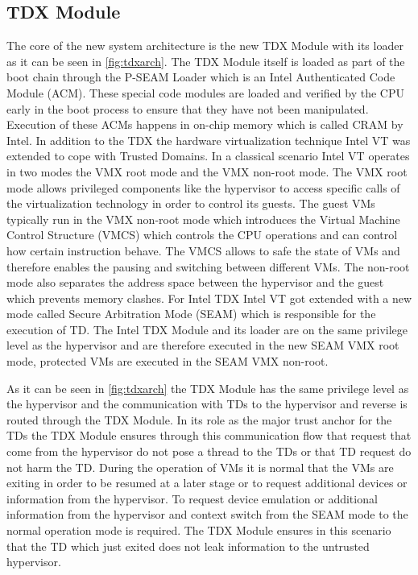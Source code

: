 \documentclass[sigplan,screen,nonacm]{acmart}
\begin{document}
\subsection{TDX Module}
The core of the new system architecture is the new TDX Module with its loader as it can be seen in \cref{fig:tdxarch}.
The TDX Module itself is loaded as part of the boot chain through the P-SEAM Loader which is an Intel Authenticated Code Module (ACM).
These special code modules are loaded and verified by the CPU early in the boot process to ensure that they have not been manipulated.
Execution of these ACMs happens in on-chip memory which is called CRAM by Intel.
In addition to the TDX the hardware virtualization technique Intel VT was extended to cope with Trusted Domains.
In a classical scenario Intel VT operates in two modes the VMX root mode and the VMX non-root mode.
The VMX root mode allows privileged components like the hypervisor to access specific calls of the virtualization technology in order to control its guests.
The guest VMs typically run in the VMX non-root mode which introduces the Virtual Machine Control Structure (VMCS) which controls the CPU operations and can control how certain instruction behave. The VMCS allows to safe the state of VMs and therefore enables the pausing and switching between different VMs.
The non-root mode also separates the address space between the hypervisor and the guest which prevents memory clashes\cite{VTx}.
For Intel TDX Intel VT got extended with a new mode called Secure Arbitration Mode (SEAM) which is responsible for the execution of TD.
The Intel TDX Module  and its loader are on the same privilege level as the hypervisor and are therefore executed in the new SEAM VMX root mode, protected VMs are executed in the SEAM VMX non-root.

As it can be seen in \cref{fig:tdxarch} the TDX Module has the same privilege level as the hypervisor and the communication with TDs to the hypervisor and reverse is routed through the TDX Module.
In its role as the major trust anchor for the TDs the TDX Module ensures through this communication flow that request that come from the hypervisor do not pose a thread to the TDs or that TD request do not harm the TD.
During the operation of VMs it is normal that the VMs are exiting in order to be resumed at a later stage or to request additional devices or information from the hypervisor.
To request device emulation or additional information from the hypervisor and context switch from the SEAM mode to the normal operation mode is required.
The TDX Module ensures in this scenario that the TD which just exited does not leak information to the untrusted hypervisor.
\end{document}
